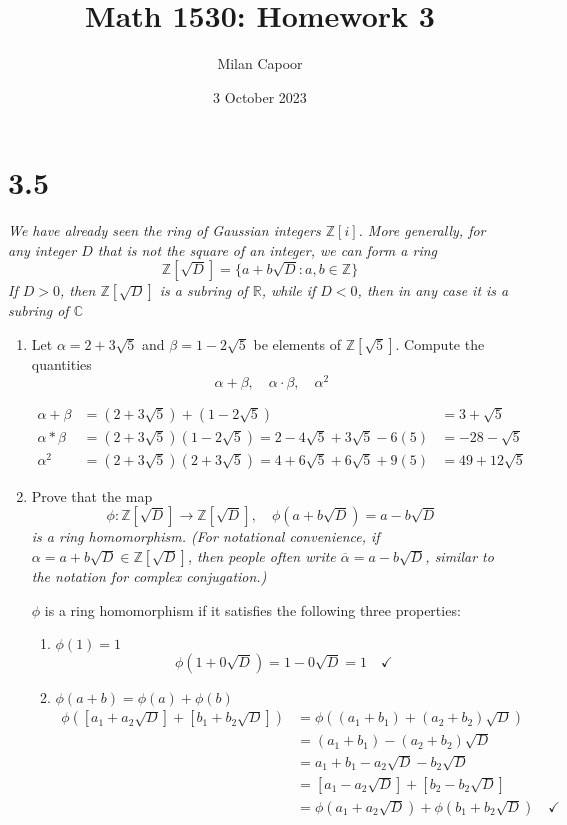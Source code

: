 \documentclass[12pt]{article}
\title{Math 1530: Homework 3}
\author{Milan Capoor}
\date{3 October 2023}
\newcommand{\R}{\mathbb{R}}
\newcommand{\Z}{\mathbb{Z}}
\begin{document}
\maketitle
\section*{3.5} 
    \emph{We have already seen the ring of Gaussian integers $\Z[i]$. More generally, for any integer $D$ that
    is not the square of an integer, we can form a ring}
    \[\Z[\sqrt D] = \{a + b\sqrt D : a, b \in \Z\}\]
    \emph{If $D > 0$, then $\Z[\sqrt D]$ is a subring of $\R$, while if $D < 0$, then in any case it is a subring of $\mathbb C$}

    \begin{enumerate}[label=(\alph*)]
        \item Let $\alpha = 2 + 3\sqrt 5$ and $\beta = 1 - 2\sqrt 5$ be elements of $\Z[\sqrt 5]$. Compute the quantities
        \[\alpha + \beta, \quad \alpha\cdot \beta, \quad \alpha^2\]

        \color{blue}
            \begin{align*}
                \alpha + \beta &= (2 + 3\sqrt{5}) + (1 - 2\sqrt{5}) &= \boxed{3 + \sqrt 5}\\
                \alpha * \beta &= (2 + 3\sqrt{5})(1 - 2\sqrt{5}) = 2 - 4\sqrt 5 + 3\sqrt 5 - 6(5) &= \boxed{-28 - \sqrt 5}\\
                \alpha^2 &= (2 + 3\sqrt{5})(2 + 3\sqrt{5}) = 4 + 6\sqrt 5 + 6\sqrt 5 + 9(5) &= \boxed{49 + 12\sqrt 5}
            \end{align*}
        \color{black}

        \item Prove that the map 
        \[\phi: \Z[\sqrt D] \to \Z[\sqrt D], \quad \phi(a + b\sqrt D) = a - b\sqrt D\]
        \emph{is a ring homomorphism. (For notational convenience, if $\alpha= a + b\sqrt D \in \Z[\sqrt D]$, then people often write $\overline \alpha = a - b \sqrt{D}$, similar to the notation for complex conjugation.)}
        
        \color{blue}
            $\phi$ is a ring homomorphism if it satisfies the following three properties:
            \begin{enumerate}
                \item $\phi(1) = 1$
                \[\phi(1 + 0\sqrt{D}) = 1 - 0\sqrt{D} = 1 \quad \checkmark \]

                \item $\phi(a + b) = \phi(a) + \phi(b)$
                \begin{align*}
                    \phi([a_1 + a_2\sqrt D] + [b_1 + b_2\sqrt D]) &= \phi((a_1 + b_1) + (a_2 + b_2)\sqrt D)\\
                    &= (a_1 + b_1) - (a_2 + b_2)\sqrt D\\
                    &= a_1 + b_1 - a_2\sqrt D - b_2 \sqrt D\\
                    &= [a_1 - a_2 \sqrt D] + [b_2 - b_2 \sqrt D]\\
                    &= \phi(a_1 + a_2 \sqrt D) + \phi(b_1 + b_2 \sqrt D) \quad \checkmark
                \end{align*}


\end{enumerate}
\end{enumerate}
\end{document}
